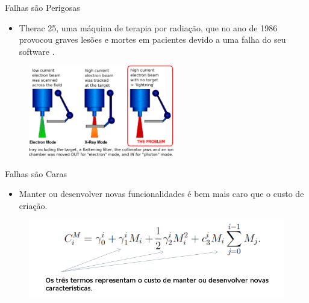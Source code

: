 \documentclass[t,14pt,mathserif]{beamer}
\begin{document}
\begin{frame}{Falhas são Perigosas}

	\begin{itemize}
	
		\item Therac 25, uma máquina de terapia por radiação, que no ano de 1986 provocou graves lesões e mortes em pacientes devido a uma falha do seu software \cite{leveson1993investigation}.
	\end{itemize}
	
	\begin{figure}[!t]
		\centering
		\includegraphics[width=2.5in]{../img/Therac25.png}
		\label{fig:knight}
	\end{figure}



\end{frame}
\begin{frame}{Falhas são Caras}
	
	\begin{itemize}
		\item Manter ou desenvolver novas funcionalidades é bem mais caro que o custo de criação\cite{tan2005comparing}.
	\end{itemize}


	\begin{figure}[!t]
		\centering
		\includegraphics[width=4.5in]{../img/custo_manutencao.png}
		\label{fig:knight}
	\end{figure}
	
\end{frame}
\end{document}
